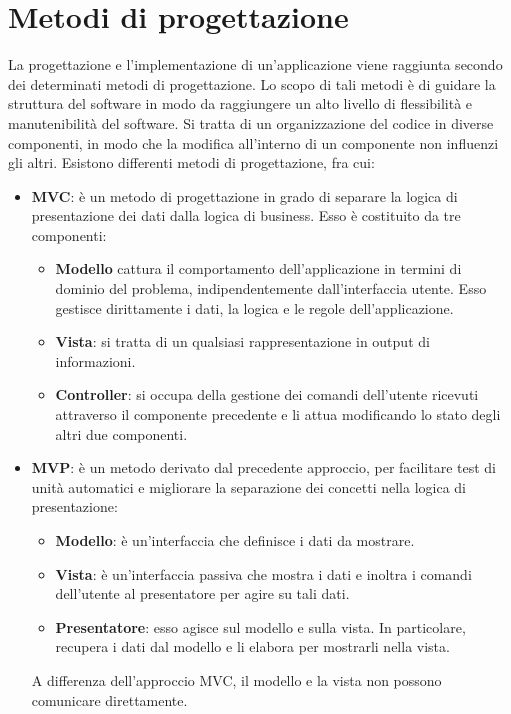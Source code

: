 \section{Metodi di progettazione}
La progettazione e l'implementazione di un'applicazione viene raggiunta secondo dei determinati metodi di progettazione. Lo scopo di tali metodi è di guidare la struttura del software in modo da raggiungere un alto livello di flessibilità e manutenibilità del software. Si tratta di un organizzazione del codice in diverse componenti, in modo che la modifica all'interno di un componente non influenzi gli altri. Esistono differenti metodi di progettazione, fra cui:
\begin{itemize}
    \item \textbf{MVC}: è un metodo di progettazione in grado di separare la logica di presentazione dei dati dalla logica di business. Esso è costituito da tre componenti:
          \begin{itemize}
              \item \textbf{Modello} cattura il comportamento dell'applicazione in termini di dominio del problema, indipendentemente dall'interfaccia utente. Esso gestisce dirittamente i dati, la logica e le regole dell'applicazione.
              \item \textbf{Vista}: si tratta di un qualsiasi rappresentazione in output di informazioni.
              \item \textbf{Controller}: si occupa della gestione dei comandi dell'utente ricevuti attraverso il componente precedente e li attua modificando lo stato degli altri due componenti.
          \end{itemize}
    \item \textbf{MVP}: è un metodo derivato dal precedente approccio, per facilitare test di unità automatici e migliorare la separazione dei concetti nella logica di presentazione:
          \begin{itemize}
              \item \textbf{Modello}: è un'interfaccia che definisce i dati da mostrare.
              \item \textbf{Vista}: è un'interfaccia passiva che mostra i dati e inoltra i comandi dell'utente al presentatore per agire su tali dati.
              \item \textbf{Presentatore}: esso agisce sul modello e sulla vista. In particolare, recupera i dati dal modello e li elabora per mostrarli nella vista.
          \end{itemize}
          A differenza dell'approccio MVC, il modello e la vista non possono comunicare direttamente.

\end{itemize}
